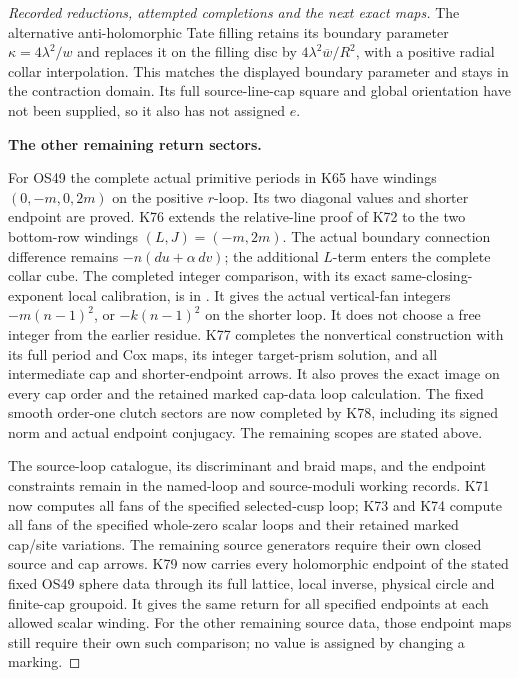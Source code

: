 \begin{proof}[Recorded reductions, attempted completions and the next exact maps]
The alternative anti-holomorphic Tate filling retains its
boundary parameter \(\kappa=4\lambda^2/w\) and replaces
it on the filling disc by
\(4\lambda^2\overline w/R^2\), with a positive radial
collar interpolation. This matches the displayed boundary
parameter and stays in the contraction domain. Its full
source-line-cap square and global orientation have not
been supplied, so it also has not assigned \(e\).

\par\medskip\noindent\textbf{The other remaining return sectors.}\par\nopagebreak[4]
For OS49 the complete actual primitive periods in K65 have
windings \((0,-m,0,2m)\) on the positive \(r\)-loop.
Its two diagonal values and shorter endpoint are proved.
K76 extends the relative-line proof of K72 to the two
bottom-row windings \((L,J)=(-m,2m)\).
The actual boundary connection difference remains
\(-n(du+\alpha\,dv)\); the additional \(L\)-term enters
the complete collar cube. The completed integer comparison,
with its exact same-closing-exponent local calibration, is in
.
It gives the actual vertical-fan integers
\(-m(n-1)^2\), or \(-k(n-1)^2\) on the shorter loop.
It does not choose a free integer from the earlier residue.
K77 completes the nonvertical construction with its full
period and Cox maps, its integer target-prism solution,
and all intermediate cap and shorter-endpoint arrows.
It also proves the exact image on every cap order and
the retained marked cap-data loop calculation. The
fixed smooth order-one clutch sectors are now completed
by K78, including its signed norm and actual endpoint conjugacy.
The remaining scopes are stated above.

The source-loop catalogue, its discriminant and braid maps,
and the endpoint constraints remain in the named-loop and
source-moduli working records. K71 now computes all fans of
the specified selected-cusp loop; K73 and K74 compute all
fans of the specified whole-zero scalar loops and their
retained marked cap/site variations. The remaining source
generators require their own closed source and cap arrows.
K79 now carries every holomorphic endpoint of the stated fixed
OS49 sphere data through its full lattice, local inverse, physical
circle and finite-cap groupoid. It gives the same return for all
specified endpoints at each allowed scalar winding. For the other
remaining source data, those endpoint maps still require their
own such comparison; no value is assigned by changing a marking.
\end{proof}
